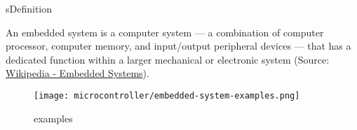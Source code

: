 \begin{frame}{s}{Definition}
    \begin{definition}
        An embedded system is a computer system --- a combination of computer processor, computer memory, and input/output peripheral devices --- that has a dedicated function within a larger mechanical or electronic system (Source: \href{https://en.wikipedia.org/wiki/Embedded_system}{Wikipedia - Embedded Systems}).
    \end{definition}
    \vspace{-1em}
    \begin{figure}
        \texttt{[image: microcontroller/embedded-system-examples.png]}
        \caption{ examples}
    \end{figure}
\end{frame}